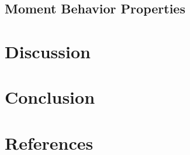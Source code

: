 \subsection{Moment Behavior Properties}


\section{Discussion}


\section{Conclusion}

\section{References}




